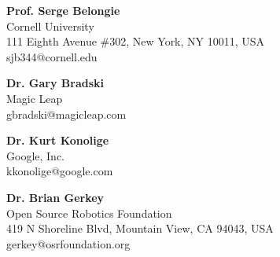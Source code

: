 

\textbf{Prof. Serge Belongie}\\
Cornell University\\
111 Eighth Avenue \#302, New York, NY 10011, USA\\
sjb344@cornell.edu

\textbf{Dr. Gary Bradski}\\
Magic Leap\\
gbradski@magicleap.com

\textbf{Dr. Kurt Konolige}\\
Google, Inc. \\
kkonolige@google.com

\textbf{Dr. Brian Gerkey}\\
Open Source Robotics Foundation\\
419 N Shoreline Blvd, Mountain View, CA 94043, USA\\
gerkey@osrfoundation.org

